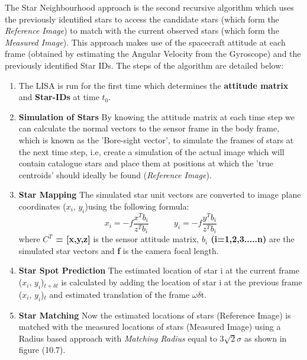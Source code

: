 \documentclass[../../main.tex]{subfiles}
\begin{document}
\begin{itemize}
    The Star Neighbourhood approach is the second recursive algorithm which uses the previously identified stars to access the candidate stars (which form the \textit{Reference Image}) to match with the current observed stars (which form the \textit{Measured Image}). This approach makes use of the spacecraft attitude at each frame (obtained by estimating the Angular Velocity from the Gyroscope) and the previously identified Star IDs. The steps of the algorithm are detailed below:
    \begin{enumerate}
        \item The LISA is run for the first time which determines the \textbf{attitude matrix} and \textbf{Star-IDs} at time $t_{0}$.
        \item \textbf{Simulation of Stars}
        By knowing the attitude matrix at each time step we can calculate the normal vectors to the sensor frame in the body frame, which is known as the 'Bore-sight vector', to simulate the frames of stars at the next time step, i.e, create a simulation of the actual image which will contain catalogue stars and place them at positions at which the 'true centroids' should ideally be found (\textit{Reference Image}).
        \item \textbf{Star Mapping}
        The simulated star unit vectors are converted to image plane coordinates ($x_{i}$, $y_{i}$)using the following formula:
        \begin{equation}
            x_{i} = -f\frac{x^{T}b_{i}}{z^{T}b_{i}} \hspace{3em} y_{i} = -f\frac{y^{T}b_{i}}{z^{T}b_{i}}
        \end{equation}
        where \textbf{$C^{T}$ = [x,y,z]} is the sensor attitude matrix, \textbf{$b_{i}$ (i=1,2,3.....n)} are the simulated star vectors and \textbf{f} is the camera focal length. 
        \item \textbf{Star Spot Prediction}
        The estimated location of star i at the current frame ($x_{i}$, $y_{i}$)$_{t+\delta t}$ is calculated by adding the location of star i at the previous frame ($x_{i}$, $y_{i}$)$_{t}$ and estimated translation of the frame $\omega\delta$t.
        \item \textbf{Star Matching} Now the estimated locations of stars (Reference Image) is matched with the measured locations of stars (Measured Image) using a Radius based approach with \emph{Matching Radius} equal to $3\sqrt{2}\sigma$ as shown in figure (10.7). 
        \begin{figure}[!h]
        \centering

\end{figure}
\end{enumerate}
\end{itemize}
\end{document}
